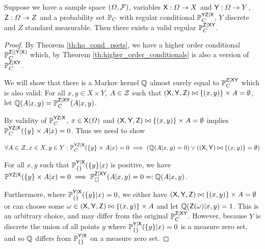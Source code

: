 \begin{theorem}
Suppose we have a sample space $(\Omega,\mathcal{F})$, variables $\mathsf{X}:\Omega\to X$ and $\mathsf{Y}:\Omega\to Y$, $\mathsf{Z}:\Omega\to Z$ and a probability set $\mathbb{P}_C$ with regular conditional $\mathbb{P}_C^{\mathsf{YZ}|\mathsf{X}}$, $Y$ discrete and $Z$ standard measurable. Then there exists a valid regular $\mathbb{P}_C^{\mathsf{Z}|\mathsf{XY}}$.
\end{theorem}

\begin{proof}
By Theorem \ref{th:ho_cond_psets}, we have a higher order conditional $\mathbb{P}_C^{\mathsf{Z}|(\mathsf{Y}|\mathsf{X})}$ which, by Theorem \ref{th:higher_order_conditionals} is also a version of $\mathbb{P}_C^{\mathsf{Z}|\mathsf{XY}}$.

We will show that there is a Markov kernel $\mathbb{Q}$ almost surely equal to $\mathbb{P}_C^{\mathsf{Z}|\mathsf{XY}}$ which is also valid. For all $x,y\in X\times Y$, $A\in\mathcal{Z}$ such that $(\mathsf{X},\mathsf{Y},\mathsf{Z})\bowtie\{(x,y)\}\times A=\emptyset$, let $\mathbb{Q}(A|x,y)=\mathbb{P}_C^{\mathsf{Z}|\mathsf{XY}}(A|x,y)$.

By validity of $\mathbb{P}_C^{\mathsf{YZ}|\mathsf{X}}$, $x\in \mathsf{X}(\Omega)$ and $(\mathsf{X},\mathsf{Y},\mathsf{Z})\bowtie\{(x,y)\}\times A=\emptyset$ implies $\mathbb{P}_C^{\mathsf{YZ}|\mathsf{X}}(\{y\}\times A|x)=0$. Thus we need to show

\begin{align}
    \forall A\in \mathcal{Z}, x\in X, y\in Y: \mathbb{P}_C^{\mathsf{YZ}|\mathsf{X}}(\{y\}\times A|x)=0 \implies \left(\mathbb{Q}(A|x,y) = 0\right) \lor \left((\mathsf{X},\mathsf{Y})\bowtie \{(x,y)\} = \emptyset\right)
\end{align}

For all $x,y$ such that $\mathbb{P}_{\{\}}^{\mathsf{Y}|\mathsf{X}}(\{y\}|x)$ is positive, we have $\mathbb{P}^{\mathsf{YZ}|\mathsf{X}}(\{y\}\times A|x)=0\implies \mathbb{P}_\square^{\mathsf{Z}|\mathsf{XY}}(A|x,y)=0=:\mathbb{Q}(A|x,y)$.

Furthermore, where $\mathbb{P}_{\{\}}^{\mathsf{Y}|\mathsf{X}}(\{y\}|x)=0$, we either have $(\mathsf{X},\mathsf{Y},\mathsf{Z})\bowtie\{(x,y)\}\times A= \emptyset$ or can choose some $\omega\in (\mathsf{X},\mathsf{Y},\mathsf{Z})\bowtie\{(x,y)\}\times A$ and let $\mathbb{Q}(\mathsf{Z}(\omega)|x,y) = 1$. This is an arbitrary choice, and may differ from the original $\mathbb{P}_C^{\mathsf{Z}|\mathsf{XY}}$. However, because $Y$ is discrete the union of all points $y$ where $\mathbb{P}_{\{\}}^{\mathsf{Y}|\mathsf{X}}(\{y\}|x)=0$ is a measure zero set, and so $\mathbb{Q}$ differs from $\mathbb{P}_{\{\}}^{\mathsf{Y}|\mathsf{X}}$ on a measure zero set.
\end{proof}


